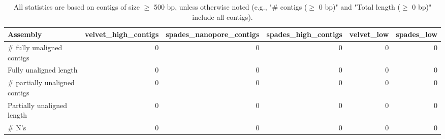 \documentclass[12pt,a4paper]{article}
\begin{document}
\begin{table}[ht]
\begin{center}
\caption{All statistics are based on contigs of size $\geq$ 500 bp, unless otherwise noted (e.g., "\# contigs ($\geq$ 0 bp)" and "Total length ($\geq$ 0 bp)" include all contigs).}
\begin{tabular}{|l*{5}{|r}|}
\hline
Assembly & velvet\_high\_contigs & spades\_nanopore\_contigs & spades\_high\_contigs & velvet\_low & spades\_low \\ \hline
\# fully unaligned contigs & 0 & 0 & 0 & 0 & 0 \\ \hline
Fully unaligned length & 0 & 0 & 0 & 0 & 0 \\ \hline
\# partially unaligned contigs & 0 & 0 & 0 & 0 & 0 \\ \hline
Partially unaligned length & 0 & 0 & 0 & 0 & 0 \\ \hline
\# N's & 0 & 0 & 0 & 0 & 0 \\ \hline
\end{tabular}
\end{center}
\end{table}
\end{document}
